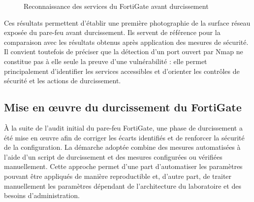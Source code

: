 \begin{figure}[htbp]
\centering
{}
\caption{Reconnaissance des services du FortiGate avant durcissement}
\label{fig:forti-nmap}
\end{figure}

Ces résultats permettent d'établir une première photographie de la surface réseau exposée du pare-feu avant durcissement. Ils servent de référence pour la comparaison avec les résultats obtenus après application des mesures de sécurité. Il convient toutefois de préciser que la détection d'un port ouvert par Nmap ne constitue pas à elle seule la preuve d'une vulnérabilité : elle permet principalement d'identifier les services accessibles et d'orienter les contrôles de sécurité et les actions de durcissement.

\subsection{Mise en œuvre du durcissement du FortiGate}

À la suite de l'audit initial du pare-feu FortiGate, une phase de durcissement a été mise en œuvre afin de corriger les écarts identifiés et de renforcer la sécurité de la configuration. La démarche adoptée combine des mesures automatisées à l'aide d'un script de durcissement et des mesures configurées ou vérifiées manuellement. Cette approche permet d'une part d'automatiser les paramètres pouvant être appliqués de manière reproductible et, d'autre part, de traiter manuellement les paramètres dépendant de l'architecture du laboratoire et des besoins d'administration.


